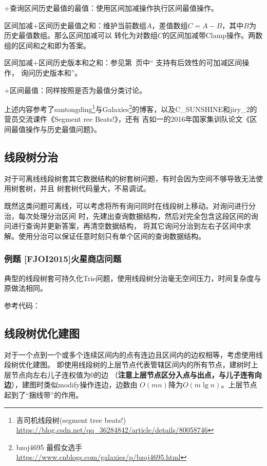 +查询区间历史最值的最值：使用区间加减操作执行区间最值操作。

区间加减+区间历史最值之和：维护当前数组$A$，差值数组$C=A-B$，其中$B$为历史最值数组。那么区间加减可以
转化为对数组$C$的区间加减带Clamp操作。两数组的区间和之和即为答案。

区间加减+区间历史版本和之和：参见第~\pageref{HistorySum}页中`` 支持有后效性的可加减区间操作，
询问历史版本和''。

+区间最值：同样按照是否为最值分类讨论。

上述内容参考了santongding\footnote{
    吉司机线段树(segment tree beats!)\\
    \url{https://blog.csdn.net/qq\_36284842/article/details/80058746}
}与Galaxies\footnote{
    bzoj4695 最假女选手\\
    \url{https://www.cnblogs.com/galaxies/p/bzoj4695.html}
}的博客，以及C\_SUNSHINE和jiry\_2的营员交流课件《Segment ree Beats!》，还有
吉如一的2016年国家集训队论文《区间最值操作与历史最值问题》。

\subsection{线段树分治}
对于可离线线段树套其它数据结构的树套树问题，有时会因为空间不够导致无法使用树套树，并且
树套树代码量大，不易调试。

既然这类问题可离线，可以考虑将所有询问同时在线段树上移动。对询问进行分治，每次处理分治区间
时，先建出查询数据结构，然后对完全包含这段区间的询问进行查询并更新答案，再清空数据结构，
将其它询问分治到左右子区间中求解。使用分治可以保证任意时刻只有单个区间的查询数据结构。

\subsubsection{例题 [FJOI2015]火星商店问题}
典型的线段树套可持久化Trie问题，使用线段树分治毫无空间压力，时间复杂度与原做法相同。

参考代码：

\subsection{线段树优化建图}
对于一个点到一个或多个连续区间内的点有连边且区间内的边权相等，考虑使用线段树优化建图。
即使用线段树的上层节点代表管辖区间内的所有节点，建树时上层节点向左右儿子连权值为0的边
（{\bfseries 注意上层节点区分入点与出点，与儿子连有向边}），建图时类似modify操作连边，边数由
$O(mn)$降为$O(m\lg n)$。上层节点起到了``捆线带''的作用。

